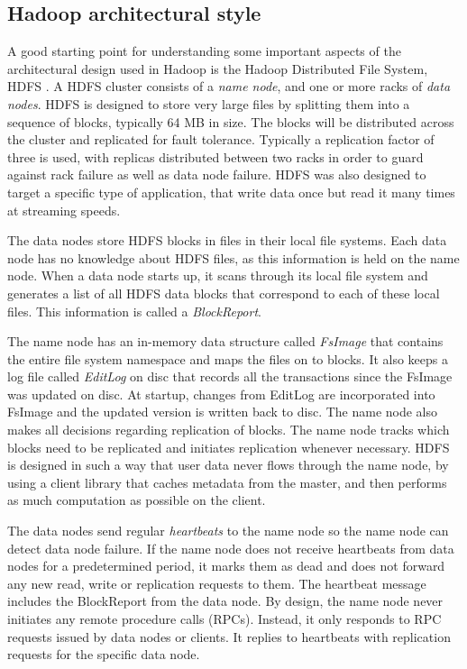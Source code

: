 \documentclass[a4paper,10pt]{article}
\begin{document}
\subsection{Hadoop architectural style}
A good starting point for understanding some important aspects of the architectural design used in Hadoop is the Hadoop Distributed File System, HDFS \cite{borthakur2008}. A HDFS cluster consists of a \emph{name node}, and one or more racks of \emph{data nodes}. HDFS is designed to store very large files by splitting them into a sequence of blocks, typically 64 MB in size. The blocks will be distributed across the cluster and replicated for fault tolerance. Typically a replication factor of three is used, with replicas distributed between two racks in order to guard against rack failure as well as data node failure. HDFS was also designed to target a specific type of application, that write data once but read it many times at streaming speeds. 

The data nodes store HDFS blocks in files in their local file systems. Each data node has no knowledge about HDFS files, as this information is held on the name node. When a data node starts up, it scans through its local file system and generates a list of all HDFS data blocks that correspond to each of these local files. This information is called a \emph{BlockReport}. 

The name node has an in-memory data structure called \emph{FsImage} that contains the entire file system namespace and maps the files on to blocks. It also keeps a log file called \emph{EditLog} on disc that records all the transactions since the FsImage was updated on disc. At startup, changes from EditLog are incorporated into FsImage and the updated version is written back to disc. The name node also makes all decisions regarding replication of blocks. The name node tracks which blocks need to be replicated and initiates replication whenever necessary. HDFS is designed in such a way that user data never flows through the name node, by using a client library that caches metadata from the master, and then performs as much computation as possible on the client.  

The data nodes send regular \emph{heartbeats} to the name node so the name node can detect data node failure. If the name node does not receive heartbeats from data nodes for a predetermined period, it marks them as dead and does not forward any new read, write or replication requests to them. The heartbeat message includes the BlockReport from the data node. By design, the name node never initiates any remote procedure calls (RPCs). Instead, it only responds to RPC requests issued by data nodes or clients. It replies to heartbeats with replication requests for the specific data node. 
\end{document}

